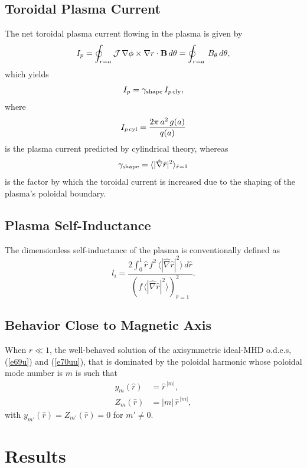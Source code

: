 \documentclass[12pt,prb,aps]{revtex4-1}
\begin{document}
\subsection{Toroidal Plasma Current}
The net toroidal plasma current flowing in the plasma is given by
\begin{equation}\label{ipdef}
I_p = \oint_{r=a}{\cal J}\,\nabla\phi\times\nabla r\cdot{\bf B}\,d\theta = \oint_{r=a}\,B_\theta\,d\theta,
\end{equation}
which yields
\begin{equation}
I_p =\gamma_{\rm shape}\, I_{p\,{\rm cly}},
\end{equation}
where
\begin{equation}
I_{p\,{\rm cyl}} = \frac{2\pi\,a^2\,g(a)}{q(a)}
\end{equation}
is the plasma current predicted by cylindrical theory, whereas
\begin{equation}
\gamma_{\rm shape} = \langle |\hat{\nabla}\hat{r}|^2\rangle_{\hat{r}=1}
\end{equation}
is the factor by which the toroidal  current is increased due to the shaping of the plasma's poloidal
boundary. 

\subsection{Plasma Self-Inductance}
The dimensionless self-inductance of the plasma is conventionally defined as\,\cite{tj}
\begin{equation}
l_i = \frac{2\int_0^1 \hat{r}\,f^2\,\langle |\hat{\nabla}\hat{r}|^2\rangle\,d\hat{r}}{(f\,\langle |\hat{\nabla}\hat{r}|^2\rangle)^2_{\hat{r}=1}}.
\end{equation}

\subsection{Behavior Close to Magnetic Axis}\label{axis}
When $\hat{r}\ll 1$, the well-behaved solution of the axisymmetric ideal-MHD o.d.e.s, (\ref{e69u}) and (\ref{e70uu}), that is dominated by the poloidal harmonic whose poloidal mode number is
$m$ is such that
\begin{align}
y_m(\hat{r}) &= \hat{r}^{\,|m|},\\[0.5ex]
Z_m(\hat{r}) &= |m|\,\hat{r}^{\,|m|},
\end{align}
with $y_{m'}(\hat{r})=Z_{m'}(\hat{r})=0$ for $m'\neq 0$. 

\section{Results}\label{results}
\end{document}
